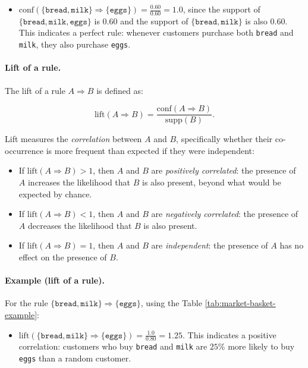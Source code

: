 \begin{itemize}
  \item $\mathrm{conf}(\{\texttt{bread}, \texttt{milk}\} \Rightarrow \{\texttt{eggs}\}) = \frac{0.60}{0.60} = 1.0$, since the support of $\{\texttt{bread}, \texttt{milk}, \texttt{eggs}\}$ is $0.60$ and the support of $\{\texttt{bread}, \texttt{milk}\}$ is also $0.60$. This indicates a perfect rule: whenever customers purchase both \texttt{bread} and \texttt{milk}, they also purchase \texttt{eggs}.
\end{itemize}

\paragraph{Lift of a rule.} The lift of a rule $A \Rightarrow B$ is defined as:

\begin{equation}
  \mathrm{lift}(A \Rightarrow B) = \frac{\mathrm{conf}(A \Rightarrow B)}{\mathrm{supp}(B)}.
\end{equation}

Lift measures the \emph{correlation} between $A$ and $B$, specifically whether their co-occurrence is more frequent than expected if they were independent:

\begin{itemize}
  \item If $\mathrm{lift}(A \Rightarrow B) > 1$, then $A$ and $B$ are \emph{positively correlated}: the presence of $A$ increases the likelihood that $B$ is also present, beyond what would be expected by chance.
  \item If $\mathrm{lift}(A \Rightarrow B) < 1$, then $A$ and $B$ are \emph{negatively correlated}: the presence of $A$ decreases the likelihood that $B$ is also present.
  \item If $\mathrm{lift}(A \Rightarrow B) = 1$, then $A$ and $B$ are \emph{independent}: the presence of $A$ has no effect on the presence of $B$.
\end{itemize}

\paragraph{Example (lift of a rule).} For the rule $\{\texttt{bread}, \texttt{milk}\} \Rightarrow \{\texttt{eggs}\}$, using the Table \ref{tab:market-basket-example}:

\begin{itemize}
  \item $\mathrm{lift}(\{\texttt{bread}, \texttt{milk}\} \Rightarrow \{\texttt{eggs}\}) = \frac{1.0}{0.80} = 1.25$. This indicates a positive correlation: customers who buy \texttt{bread} and \texttt{milk} are $25\%$ more likely to buy \texttt{eggs} than a random customer.
\end{itemize}

